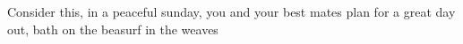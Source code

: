 Consider this, in a peaceful sunday, you and your best mates plan for a great day out, bath on the beasurf in the weaves  